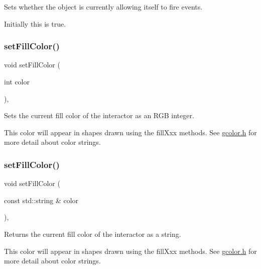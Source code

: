 Sets whether the object is currently allowing itself to fire events. 

Initially this is true. \mbox{\label{classGDrawingSurface_a47fad447b715f2f303538434eed26709}} 
\subsubsection{\texorpdfstring{set\+Fill\+Color()}{setFillColor()}\hspace{0.1cm}{\footnotesize\ttfamily [1/2]}}
{\footnotesize\ttfamily void set\+Fill\+Color (\begin{DoxyParamCaption}\item[{int}]{color }\end{DoxyParamCaption})\hspace{0.3cm}{\ttfamily [virtual]}, {\ttfamily [inherited]}}



Sets the current fill color of the interactor as an R\+GB integer. 

This color will appear in shapes drawn using the fill\+Xxx methods. See \mbox{\hyperlink{gcolor_8h_source}{gcolor.\+h}} for more detail about color strings. \mbox{\label{classGDrawingSurface_adbc18b1a930aadd97d7437f9f7265b96}} 
\subsubsection{\texorpdfstring{set\+Fill\+Color()}{setFillColor()}\hspace{0.1cm}{\footnotesize\ttfamily [2/2]}}
{\footnotesize\ttfamily void set\+Fill\+Color (\begin{DoxyParamCaption}\item[{const std\+::string \&}]{color }\end{DoxyParamCaption})\hspace{0.3cm}{\ttfamily [virtual]}, {\ttfamily [inherited]}}



Returns the current fill color of the interactor as a string. 

This color will appear in shapes drawn using the fill\+Xxx methods. See \mbox{\hyperlink{gcolor_8h_source}{gcolor.\+h}} for more detail about color strings. \mbox{\label{classGCanvas_a2d22014c7fa3bccfd58c982aea1b55fa}} 
